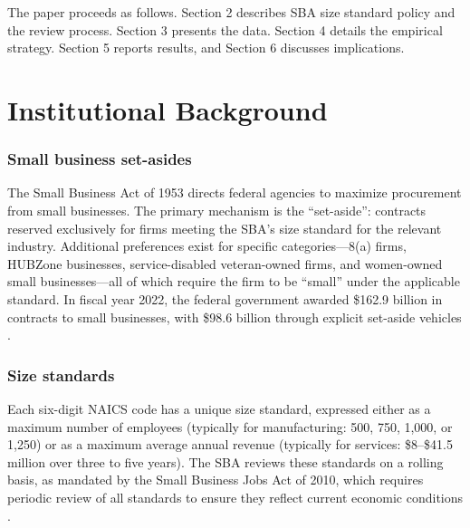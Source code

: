\documentclass[12pt]{article}
\begin{document}
The paper proceeds as follows. Section 2 describes SBA size standard policy and the review process. Section 3 presents the data. Section 4 details the empirical strategy. Section 5 reports results, and Section 6 discusses implications.

\section{Institutional Background}

\subsubsection*{Small business set-asides} The Small Business Act of 1953 directs federal agencies to maximize procurement from small businesses. The primary mechanism is the ``set-aside'': contracts reserved exclusively for firms meeting the SBA's size standard for the relevant industry. Additional preferences exist for specific categories---8(a) firms, HUBZone businesses, service-disabled veteran-owned firms, and women-owned small businesses---all of which require the firm to be ``small'' under the applicable standard. In fiscal year 2022, the federal government awarded \$162.9 billion in contracts to small businesses, with \$98.6 billion through explicit set-aside vehicles \citep{sba2023scorecard}.

\subsubsection*{Size standards} Each six-digit NAICS code has a unique size standard, expressed either as a maximum number of employees (typically for manufacturing: 500, 750, 1,000, or 1,250) or as a maximum average annual revenue (typically for services: \$8--\$41.5 million over three to five years). The SBA reviews these standards on a rolling basis, as mandated by the Small Business Jobs Act of 2010, which requires periodic review of all standards to ensure they reflect current economic conditions \citep{sba2014methodology}.
\end{document}
